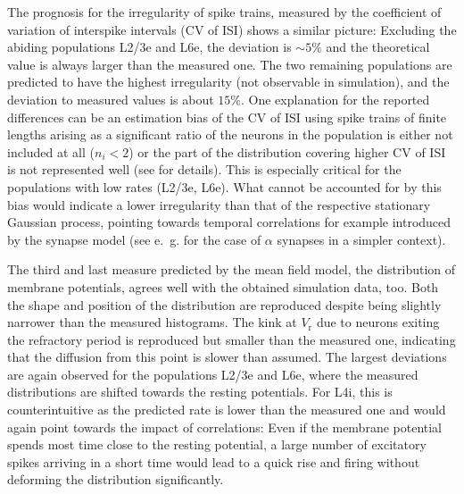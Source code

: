 The prognosis for the irregularity of spike trains, measured by the coefficient of
variation of interspike intervals (CV of ISI) shows a similar picture:
Excluding the abiding populations L2/3e and L6e, the deviation is $\sim 5 \%$
and the theoretical value is always larger than the measured one. The two remaining 
populations are predicted to have the highest irregularity (not observable in simulation), 
and the deviation to measured values is about $15 \%$. 
One explanation for the reported differences can be an estimation bias of the CV of ISI 
using spike trains of finite lengths arising as a significant ratio of the neurons in the 
population is either not included at all ($n_i < 2$) or the part of the distribution 
covering higher CV of ISI is not represented well (see \cite{nawrot2010analysis} for details). 
This is especially critical for the populations with low rates (L2/3e, L6e).
What cannot be accounted for by this bias would indicate a lower irregularity than that 
of the respective stationary Gaussian process, pointing towards temporal correlations
for example introduced by the synapse model 
(see e.~g. \cite{brunel1999fast} for the case of $\alpha$ synapses in a simpler context). 

The third and last measure predicted by the mean field model, the distribution of 
membrane potentials, agrees well with the obtained simulation data, too. 
Both the shape and position of the distribution are reproduced despite being slightly 
narrower than the measured histograms. The kink at $V_\text{r}$ due to neurons exiting the 
refractory period is reproduced but smaller than the measured one, indicating that the diffusion
from this point is slower than assumed. The largest deviations are again observed for 
the populations L2/3e and L6e, where the measured distributions are shifted towards 
the resting potentials. For L4i, this is counterintuitive as the predicted rate is 
lower than the measured one and would again point towards the impact of correlations:
Even if the membrane potential spends most time close to the resting potential, 
a large number of excitatory spikes arriving in a short time would lead to a quick rise and
firing without deforming the distribution significantly.  


